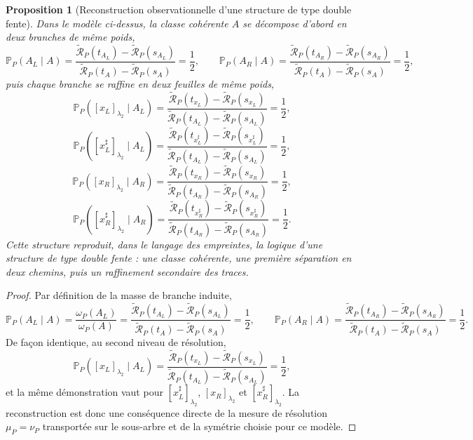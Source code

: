\documentclass[11pt,a4paper]{article}
\newtheorem{proposition}{Proposition}
\begin{document}
\begin{appendices}
\begin{proposition}[Reconstruction observationnelle d'une structure de type double fente]
Dans le modèle ci-dessus, la classe cohérente \(A\) se décompose d'abord en deux branches de même poids,
\[
\mathbb P_P(A_L\mid A)
=
\frac{\widetilde{\mathcal R}_P(t_{A_L})-\widetilde{\mathcal R}_P(s_{A_L})}
{\widetilde{\mathcal R}_P(t_A)-\widetilde{\mathcal R}_P(s_A)}
=
\frac12,
\qquad
\mathbb P_P(A_R\mid A)
=
\frac{\widetilde{\mathcal R}_P(t_{A_R})-\widetilde{\mathcal R}_P(s_{A_R})}
{\widetilde{\mathcal R}_P(t_A)-\widetilde{\mathcal R}_P(s_A)}
=
\frac12,
\]
puis chaque branche se raffine en deux feuilles de même poids,
\[
\mathbb P_P([x_L]_{\lambda_2}\mid A_L)
=
\frac{\widetilde{\mathcal R}_P(t_{x_L})-\widetilde{\mathcal R}_P(s_{x_L})}
{\widetilde{\mathcal R}_P(t_{A_L})-\widetilde{\mathcal R}_P(s_{A_L})}
=
\frac12,
\]
\[
\mathbb P_P([x_L^\sharp]_{\lambda_2}\mid A_L)
=
\frac{\widetilde{\mathcal R}_P(t_{x_L^\sharp})-\widetilde{\mathcal R}_P(s_{x_L^\sharp})}
{\widetilde{\mathcal R}_P(t_{A_L})-\widetilde{\mathcal R}_P(s_{A_L})}
=
\frac12,
\]
\[
\mathbb P_P([x_R]_{\lambda_2}\mid A_R)
=
\frac{\widetilde{\mathcal R}_P(t_{x_R})-\widetilde{\mathcal R}_P(s_{x_R})}
{\widetilde{\mathcal R}_P(t_{A_R})-\widetilde{\mathcal R}_P(s_{A_R})}
=
\frac12,
\]
\[
\mathbb P_P([x_R^\sharp]_{\lambda_2}\mid A_R)
=
\frac{\widetilde{\mathcal R}_P(t_{x_R^\sharp})-\widetilde{\mathcal R}_P(s_{x_R^\sharp})}
{\widetilde{\mathcal R}_P(t_{A_R})-\widetilde{\mathcal R}_P(s_{A_R})}
=
\frac12.
\]
Cette structure reproduit, dans le langage des empreintes, la logique d'une structure de type double fente : une classe cohérente, une première séparation en deux chemins, puis un raffinement secondaire des traces.
\end{proposition}

\begin{proof}
Par définition de la masse de branche induite,
\[
\mathbb P_P(A_L\mid A)=\frac{\omega_P(A_L)}{\omega_P(A)}
=
\frac{\widetilde{\mathcal R}_P(t_{A_L})-\widetilde{\mathcal R}_P(s_{A_L})}
{\widetilde{\mathcal R}_P(t_A)-\widetilde{\mathcal R}_P(s_A)}
=\frac12,
\qquad
\mathbb P_P(A_R\mid A)=\frac{\widetilde{\mathcal R}_P(t_{A_R})-\widetilde{\mathcal R}_P(s_{A_R})}
{\widetilde{\mathcal R}_P(t_A)-\widetilde{\mathcal R}_P(s_A)}
=\frac12.
\]
De façon identique, au second niveau de résolution,
\[
\mathbb P_P([x_L]_{\lambda_2}\mid A_L)
=
\frac{\widetilde{\mathcal R}_P(t_{x_L})-\widetilde{\mathcal R}_P(s_{x_L})}
{\widetilde{\mathcal R}_P(t_{A_L})-\widetilde{\mathcal R}_P(s_{A_L})}
=
\frac12,
\]
et la même démonstration vaut pour \([x_L^\sharp]_{\lambda_2}\), \([x_R]_{\lambda_2}\) et \([x_R^\sharp]_{\lambda_2}\). La reconstruction est donc une conséquence directe de la mesure de résolution \(\mu_P=\nu_P\) transportée sur le sous-arbre et de la symétrie choisie pour ce modèle.
\end{proof}


\end{appendices}
\end{document}
